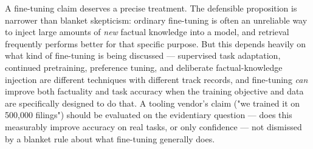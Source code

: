 A fine-tuning claim deserves a precise treatment. The defensible proposition is narrower than blanket skepticism: ordinary fine-tuning is often an unreliable way to inject large amounts of \emph{new} factual knowledge into a model, and retrieval frequently performs better for that specific purpose. But this depends heavily on what kind of fine-tuning is being discussed --- supervised task adaptation, continued pretraining, preference tuning, and deliberate factual-knowledge injection are different techniques with different track records, and fine-tuning \emph{can} improve both factuality and task accuracy when the training objective and data are specifically designed to do that. A tooling vendor's claim ("we trained it on 500,000 filings") should be evaluated on the evidentiary question --- does this measurably improve accuracy on real tasks, or only confidence --- not dismissed by a blanket rule about what fine-tuning generally does.
